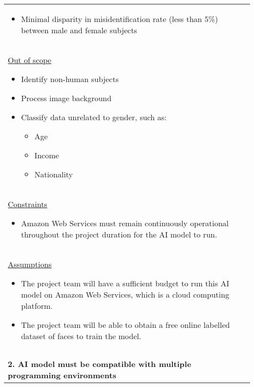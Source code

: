 \begin{longtable}{ | p{} l | }
{\begin{itemize}
\begin{itemize}
                    \item Mouth
                \end{itemize}
            \item Minimal disparity in misidentification rate (less than 5\%) between male and female subjects
        \end{itemize}
    } \\
    \multicolumn{2}{|p{\textwidth}|}{\hspace{0.6cm}\underline{Out of scope}
        \begin{itemize}
            \item Identify non-human subjects
            \item Process image background
            \item Classify data unrelated to gender, such as:
                \begin{itemize}
                    \item Age
                    \item Income
                    \item Nationality
                \end{itemize}
        \end{itemize}
    } \\
    \multicolumn{2}{|p{\textwidth}|}{\hspace{0.6cm}\underline{Constraints}
        \begin{itemize}
            \item Amazon Web Services must remain continuously operational throughout the project duration for the AI model to run.
        \end{itemize}
    } \\
    \multicolumn{2}{|p{\textwidth}|}{\hspace{0.6cm}\underline{Assumptions}
        \begin{itemize}
            \item The project team will have a sufficient budget to run this AI model on Amazon Web Services, which is a cloud computing platform.
            \item The project team will be able to obtain a free online labelled dataset of faces to train the model.
        \end{itemize}
    } \\\\\\
    \multicolumn{2}{|p{\textwidth}|}{\textbf{2. AI model must be compatible with multiple programming environments}} \\

\end{longtable}
